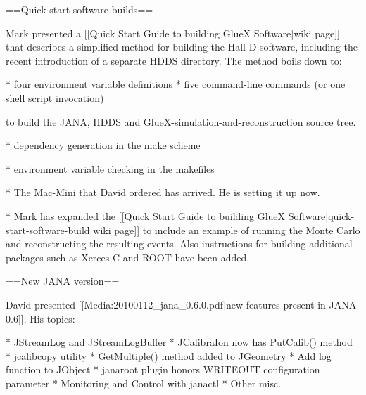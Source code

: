 \documentclass[xcolor=dvipsnames]{beamer}
\begin{document}
==Quick-start software builds==

Mark presented a [[Quick Start Guide to building GlueX Software|wiki page]] that describes a simplified method for building the Hall D software, including the recent introduction of a separate HDDS directory. The method boils down to:

* four environment variable definitions
* five command-line commands (or one shell script invocation)

to build the JANA, HDDS and GlueX-simulation-and-reconstruction source tree.

* dependency generation in the make scheme

* environment variable checking in the makefiles

* The Mac-Mini that David ordered has arrived. He is setting it up now.

* Mark has expanded the [[Quick Start Guide to building GlueX Software|quick-start-software-build wiki page]] to include an example of running the Monte Carlo and reconstructing the resulting events. Also instructions for building additional packages such as Xerces-C and ROOT have been added.

==New JANA version==

David presented [[Media:20100112_jana_0.6.0.pdf|new features present in JANA 0.6]]. His topics:

* JStreamLog and JStreamLogBuﬀer
* JCalibraIon now has PutCalib() method
* jcalibcopy utility
* GetMultiple() method added to JGeometry
* Add log function to JObject
* janaroot plugin honors WRITEOUT conﬁguration parameter 
* Monitoring and Control with janactl 
* Other misc.

\end{document}

